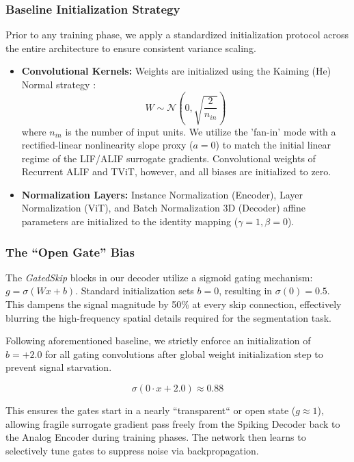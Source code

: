 \documentclass[conference]{IEEEtran}
\begin{document}
\subsubsection{Baseline Initialization Strategy}
Prior to any training phase, we apply a standardized initialization protocol across the entire architecture to ensure consistent variance scaling.

\begin{itemize}
    \item \textbf{Convolutional Kernels:} Weights are initialized using the Kaiming (He) Normal strategy \cite{He2015}:
    \begin{equation}
        W \sim \mathcal{N}\left(0, \sqrt{\frac{2}{n_{in}}}\right)
    \end{equation}
    where $n_{in}$ is the number of input units. We utilize the 'fan-in' mode with a rectified-linear nonlinearity slope proxy ($a=0$) to match the initial linear regime of the LIF/ALIF surrogate gradients. Convolutional weights of Recurrent ALIF and TViT, however, and all biases are initialized to zero.
    
    \item \textbf{Normalization Layers:} Instance Normalization (Encoder), Layer Normalization (ViT), and Batch Normalization 3D (Decoder) affine parameters are initialized to the identity mapping ($\gamma=1, \beta=0$).
\end{itemize}

\subsubsection{The ``Open Gate'' Bias}
The \textit{GatedSkip} blocks in our decoder utilize a sigmoid gating mechanism: $g = \sigma(W x + b)$. Standard initialization sets $b = 0$, resulting in $\sigma(0) = 0.5$. This dampens the signal magnitude by 50\% at every skip connection, effectively blurring the high-frequency spatial details required for the segmentation task.

Following aforementioned baseline, we strictly enforce an initialization of $b=+2.0$ for all gating convolutions after global weight initialization step to  prevent signal starvation.

\begin{equation}
    \sigma(0 \cdot x + 2.0) \approx 0.88
\end{equation}

This ensures the gates start in a nearly ``transparent`` or open state ($g \approx 1$), allowing fragile surrogate gradient pass freely from the Spiking Decoder back to the Analog Encoder during training phases. The network then learns to selectively tune gates to suppress noise via backpropagation.
\end{document}
